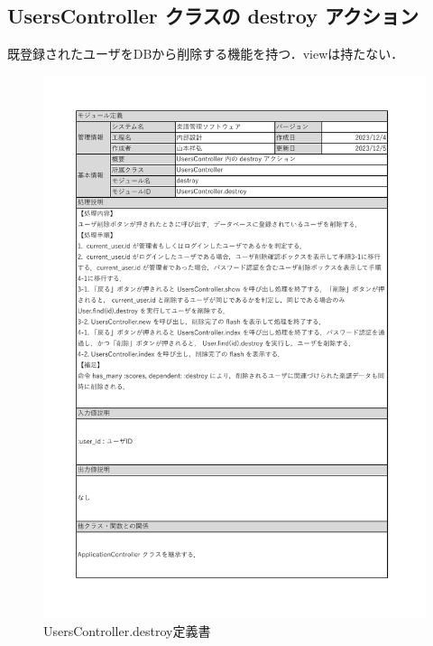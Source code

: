 \subsection*{UsersController クラスの destroy アクション}
既登録されたユーザをDBから削除する機能を持つ．viewは持たない．
\begin{figure}[H]
	\centering
	\includegraphics[scale=0.6]{img/Users/xlsx/UsersController_destroy.pdf}
	\vspace{-1cm}
	\caption{UsersController.destroy定義書}
\end{figure}
